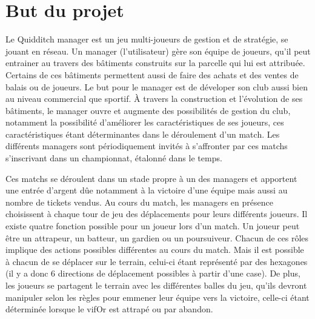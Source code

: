 \documentclass[a4paper,titlepage]{scrreprt}
\begin{document}
\section{But du projet}
  Le \gls{Quidditch} \gls{manager} est un jeu multi-joueurs de gestion
  et de stratégie, se jouant en réseau.
  Un manager (l'utilisateur) gère son équipe de \gls{joueur}s, qu'il peut entrainer
  au travers des bâtiments construits sur la parcelle qui lui est attribuée. Certains de ces bâtiments permettent aussi de faire des achats et des ventes de balais ou de joueurs.
  Le but pour le manager est de déveloper son \gls{club} aussi bien au niveau commercial
  que sportif.
  À travers la construction et l'évolution de ses bâtiments, le manager ouvre et
  augmente des possibilités de gestion du club, notamment la possibilité
  d'améliorer les caractéristiques de ses joueurs, ces caractéristiques
  étant déterminantes dans le déroulement d'un match.
  Les différents managers sont périodiquement invités à s'affronter par
  ces \gls{match}s s'inscrivant dans un championnat, étalonné dans le temps. 
  
  Ces matchs se déroulent
  dans un stade propre à un des managers et apportent une entrée d'argent
  dûe notamment à la victoire d'une équipe mais aussi au nombre de tickets vendus.
  Au cours du match, les managers en présence choisissent à chaque tour de jeu
  des déplacements pour leurs différents joueurs. Il existe quatre fonction possible
  pour un joueur lors d'un match. Un joueur peut être un \gls{attrapeur}, un \gls{batteur}, un \gls{gardien}
  ou un \gls{poursuiveur}.
  Chacun de ces rôles implique des actions possibles différentes au cours du match.
  Mais il est possible à chacun de se déplacer sur le terrain, celui-ci étant représenté par
  des hexagones (il y a donc 6 directions de déplacement possibles à partir d'une case).
  De plus, les joueurs se partagent le terrain avec les différentes balles du jeu, 
  qu'ils devront manipuler selon les règles pour emmener leur équipe vers la victoire,
  celle-ci étant déterminée lorsque le \gls{vifOr} est attrapé ou par abandon.
\end{document}
